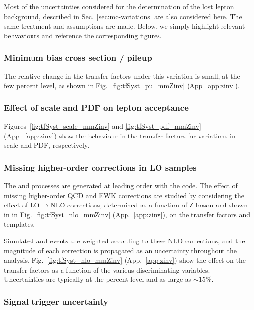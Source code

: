 Most of the uncertainties considered for the determination of the lost
lepton background, described in Sec.~\ref{sec:mc-variations} are also
considered here. The same treatment and assumptions are made. Below,
we simply highlight relevant behvaviours and reference the
corresponding figures. 

\subsubsection{Minimum bias cross section / pileup}
\label{sec:tfSyst_pu-zinv}

The relative change in the transfer factors under this variation is
small, at the few percent level, as shown in
Fig.~\ref{fig:tfSyst_pu_mmZinv} (App~\ref{app:zinv}).

\subsubsection{Effect of scale and PDF on lepton acceptance}
\label{sec:tfSyst_pdf-zinv}

Figures~\ref{fig:tfSyst_scale_mmZinv} and \ref{fig:tfSyst_pdf_mmZinv}
(App.~\ref{app:zinv}) show the behaviour in the transfer factors for
variations in scale and PDF, respectively.

\subsubsection{Missing higher-order corrections in LO \texorpdfstring{\MADGRAPH}{MadGraph}
  samples}
\label{sec:nlo-zinv}

The \zmmj and \znunuj processes are generated at leading order with
the \MADGRAPH code. The effect of missing higher-order QCD and EWK
corrections are studied by considering the effect of
LO$\rightarrow$NLO corrections, determined as a function of Z boson
\Pt and shown in in Fig.~\ref{fig:tfSyst_nlo_mmZinv}
(App.~\ref{app:zinv}), on the transfer factors and \HTmiss templates.

Simulated \zmmj and \znunuj events are weighted according to these NLO
corrections, and the magnitude of each correction is propagated as an
uncertainty throughout the analysis. Fig.~\ref{fig:tfSyst_nlo_mmZinv}
(App.~\ref{app:zinv}) show the effect on the transfer factors as a
function of the various discriminating variables. Uncertainties are
typically at the percent level and as large as $\sim 15\%$.

\subsubsection{Signal trigger uncertainty}
\label{sec:tfSyst_trigger-zinv}

